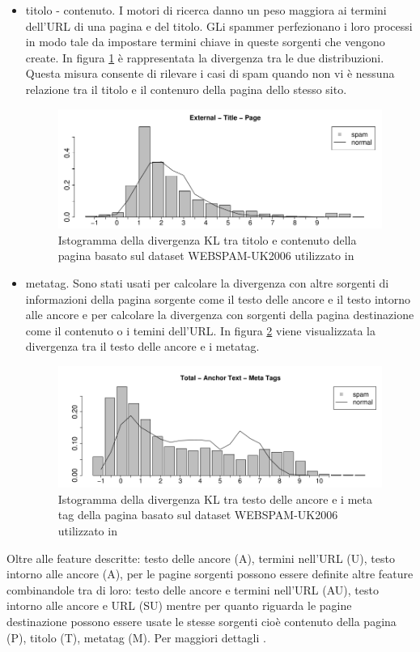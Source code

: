 \begin{itemize}
\item titolo - contenuto. I motori di ricerca danno un peso maggiora ai termini dell'URL di una pagina e del titolo. GLi spammer perfezionano i loro processi in modo tale da impostare termini chiave in queste sorgenti che vengono create. In figura \ref{fig:martinez7} è rappresentata la divergenza tra le due distribuzioni. Questa misura consente di rilevare i casi di spam quando non vi è nessuna relazione tra il titolo e il contenuro della pagina dello stesso sito.
\begin{figure}[htbp]
\centering
\includegraphics[width=12cm]{immagini/martinez/martinez7}
\caption{Istogramma della divergenza KL tra titolo  e contenuto della pagina basato sul dataset WEBSPAM-UK2006 utilizzato in \cite{Martinez-Romo:2009:WSI:1531914.1531920}}
\label{fig:martinez7}
\end{figure}


\item metatag. Sono stati usati per calcolare la divergenza con altre sorgenti di informazioni della pagina sorgente come il testo delle ancore e il testo intorno alle ancore e per calcolare la divergenza con sorgenti della pagina destinazione come il contenuto o i temini dell'URL. In figura \ref{fig:martinez8} viene visualizzata la divergenza tra il testo delle ancore e i metatag.
\begin{figure}[htbp]
\centering
\includegraphics[width=12cm]{immagini/martinez/martinez8}
\caption{Istogramma della divergenza KL tra testo delle ancore  e i meta tag della pagina basato sul dataset WEBSPAM-UK2006 utilizzato in \cite{Martinez-Romo:2009:WSI:1531914.1531920}}
\label{fig:martinez8}
\end{figure}
\end{itemize}
Oltre alle feature descritte: testo delle ancore (A), termini nell'URL (U), testo intorno alle ancore (A), per le pagine sorgenti possono essere definite altre feature combinandole tra di loro: testo delle ancore e termini nell'URL (AU), testo intorno alle ancore e URL (SU) mentre per quanto riguarda le pagine destinazione possono essere usate le stesse sorgenti cioè contenuto della pagina (P), titolo (T), metatag (M). Per maggiori dettagli \cite{Martinez-Romo:2009:WSI:1531914.1531920}.

